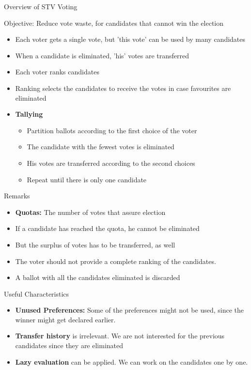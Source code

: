 \documentclass{beamer}
\begin{document}
\begin{frame}[allowframebreaks]{Overview of STV Voting}
\begin{block}{Objective:}
Reduce vote waste, for candidates that cannot win the election
\end{block}

\begin{itemize}
\item Each voter gets a single vote, but 'this vote' can be used by many candidates
\item When a candidate is eliminated, 'his' votes are transferred
\item Each voter ranks candidates
\item Ranking selects the candidates to receive the votes in case favourites are eliminated
\item \textbf{Tallying}
\begin{itemize}
\item Partition ballots according to the first choice of the voter
\item The candidate with the fewest votes is eliminated
\item His votes are transferred according to the second choices
\item Repeat until there is only one candidate
\end{itemize}
\end{itemize}

\begin{block}{Remarks}
\begin{itemize}
\item \textbf{Quotas:} The number of votes that assure election
\item If a candidate has reached the quota, he cannot be eliminated
\item But the surplus of votes has to be transferred, as well
\item The voter should not provide a complete ranking of the candidates.
\item A ballot with all the candidates eliminated is discarded
\end{itemize}
\end{block}

\begin{block}{Useful Characteristics}
\begin{itemize}
\item \textbf{Unused Preferences:} Some of the preferences might not be used, since the winner might get declared earlier.
\item \textbf{Transfer history} is irrelevant. We are not interested for the previous candidates since they are eliminated
\item \textbf{Lazy evaluation} can be applied. We can work on the candidates one by one.
\end{itemize}
\end{block}


\end{frame}
\end{document}
